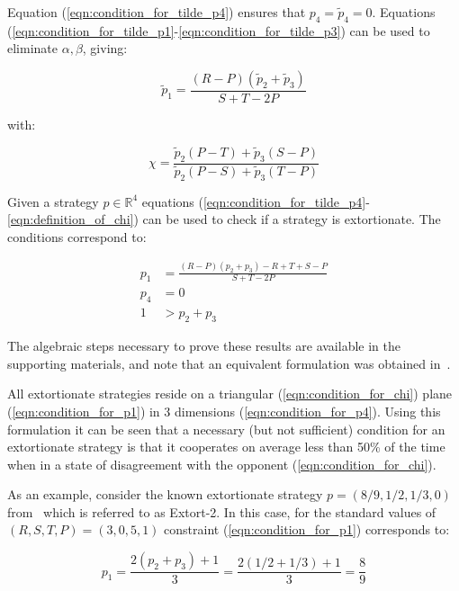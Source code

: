 \documentclass[a4paper]{article}
\begin{document}
Equation (\ref{eqn:condition_for_tilde_p4}) ensures that \(p_4=\tilde p_4=0\).
Equations (\ref{eqn:condition_for_tilde_p1}-\ref{eqn:condition_for_tilde_p3})
can be used to eliminate \(\alpha, \beta\), giving:

\begin{equation}\label{eqn:planar_definition_of_extortion}
    \tilde p_1 = \frac{(R - P)(\tilde p_2 + \tilde p_3)}{S + T - 2P}
\end{equation}

with:

\begin{equation}\label{eqn:definition_of_chi}
    \chi = \frac{\tilde p_2 (P - T) + \tilde p_3 (S - P)}
                {\tilde p_2 (P - S) + \tilde p_3 (T - P)}
\end{equation}

Given a strategy \(p\in\mathbb{R}^{4}\) equations
(\ref{eqn:condition_for_tilde_p4}-\ref{eqn:definition_of_chi}) can be used to
check if a strategy is extortionate. The conditions correspond to:

\begin{align}
    p_1 & = \frac{(R-P)(p_2 + p_3) - R + T + S - P}{S + T - 2P}
     \label{eqn:condition_for_p1}\\
    p_4 & = 0 \label{eqn:condition_for_p4}\\
    1 & > p_2 + p_3\label{eqn:condition_for_chi}
\end{align}

The algebraic steps necessary to prove these results are available in the
supporting materials, and note that an equivalent formulation was obtained
in~\cite{adami2013evolutionary}.

All extortionate strategies reside on a triangular (\ref{eqn:condition_for_chi})
plane (\ref{eqn:condition_for_p1}) in 3 dimensions (\ref{eqn:condition_for_p4}).
Using this formulation it can be seen that a necessary (but not sufficient)
condition for an extortionate strategy is that it cooperates on average less
than 50\% of the time when in a state of disagreement with the opponent
(\ref{eqn:condition_for_chi}).

As an example, consider the known extortionate strategy \(p=(8 / 9, 1 / 2, 1 /
3, 0)\) from~\cite{Stewart2012} which is referred to as Extort-2. In
this case, for the standard values of \((R, S, T, P) = (3, 0, 5, 1)\)
constraint (\ref{eqn:condition_for_p1}) corresponds to:

\begin{equation}
    p_1 = \frac{2(p_2 + p_3) + 1}{3}
        = \frac{2(1 / 2 + 1 / 3) + 1}{3}
        = \frac{8}{9}
\end{equation}
\end{document}
